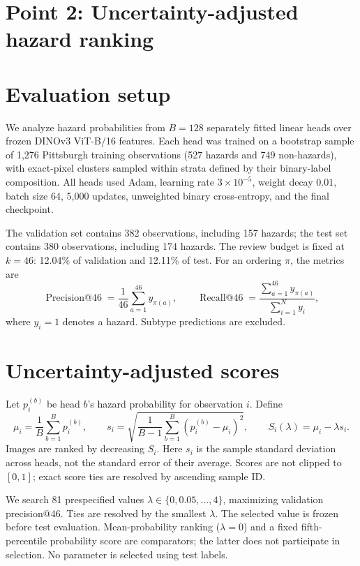 \documentclass[10pt,a4paper]{article}
\begin{document}
\section*{Point 2: Uncertainty-adjusted hazard ranking}
\section{Evaluation setup}
We analyze hazard probabilities from $B=128$ separately fitted linear heads over
frozen DINOv3 ViT-B/16 features. Each head was trained on a bootstrap sample of
1,276 Pittsburgh training observations (527 hazards and 749 non-hazards), with
exact-pixel clusters sampled within strata defined by their binary-label composition.
All heads used Adam, learning rate $3\times10^{-5}$, weight decay $0.01$, batch
size 64, 5,000 updates, unweighted binary cross-entropy, and the final checkpoint.

The validation set contains 382 observations, including 157 hazards; the test set
contains 380 observations, including 174 hazards. The review budget is fixed at
$k=46$: 12.04\% of validation and 12.11\% of test. For an ordering $\pi$, the metrics are
\begin{equation}
\operatorname{Precision@46}=\frac{1}{46}\sum_{a=1}^{46}y_{\pi(a)},
\qquad
\operatorname{Recall@46}=\frac{\sum_{a=1}^{46}y_{\pi(a)}}{\sum_{i=1}^{N}y_i},
\end{equation}
where $y_i=1$ denotes a hazard. Subtype predictions are excluded.

\section{Uncertainty-adjusted scores}
Let $p_i^{(b)}$ be head $b$'s hazard probability for observation $i$. Define
\begin{equation}
\mu_i=\frac{1}{B}\sum_{b=1}^{B}p_i^{(b)},\qquad
s_i=\sqrt{\frac{1}{B-1}\sum_{b=1}^{B}(p_i^{(b)}-\mu_i)^2},\qquad
S_i(\lambda)=\mu_i-\lambda s_i.
\end{equation}
Images are ranked by decreasing $S_i$. Here $s_i$ is the sample standard deviation
across heads, not the standard error of their average. Scores are not clipped to
$[0,1]$; exact score ties are resolved by ascending sample ID.

We search 81 prespecified values $\lambda\in\{0,0.05,\ldots,4\}$, maximizing
validation precision@46. Ties are resolved by the smallest $\lambda$. The selected
value is frozen before test evaluation. Mean-probability ranking ($\lambda=0$)
and a fixed fifth-percentile probability score are comparators; the latter does
not participate in selection. No parameter is selected using test labels.
\end{document}
